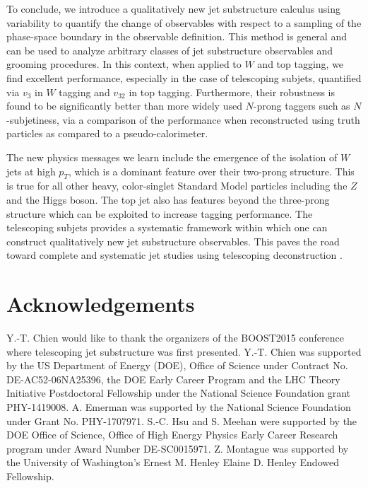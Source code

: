 \documentclass[aps,prl,floatfix,preprintnumbers,twocolumn,groupedaddress,nofootinbib]{revtex4-1}
\begin{document}
To conclude, we introduce a qualitatively new jet substructure calculus using variability to quantify the change of observables with respect to a sampling of the phase-space boundary in the observable definition. This method is general and can be used to analyze arbitrary classes of jet substructure observables and grooming procedures. In this context, when applied to $W$ and top tagging, we find excellent performance, especially in the case of telescoping subjets, quantified via $v_3$ in $W$ tagging and $v_{32}$ in top tagging. Furthermore, their robustness is found to be significantly better than more widely used $N$-prong taggers such as $N$-subjetiness, via a comparison of the performance when reconstructed using truth particles as compared to a pseudo-calorimeter.

The new physics messages we learn include the emergence of the isolation of $W$ jets at high $p_T$, which is a dominant feature over their two-prong structure. This is true for all other heavy, color-singlet Standard Model particles including the $Z$ and the Higgs boson. The top jet also has features beyond the three-prong structure which can be exploited to increase tagging performance. The telescoping subjets provides a systematic framework within which one can construct qualitatively new jet substructure observables. This paves the road toward complete and systematic jet studies using telescoping deconstruction \cite{Chien:2017decon}.




\section{Acknowledgements}
Y.-T. Chien would like to thank the organizers of the BOOST2015 conference where telescoping jet substructure was first presented. Y.-T. Chien was supported by the US Department of Energy (DOE), Office of Science under Contract No. DE-AC52-06NA25396, the DOE Early Career Program and the LHC Theory Initiative Postdoctoral Fellowship under the National Science Foundation grant PHY-1419008. A. Emerman was supported by the National Science Foundation under Grant No. PHY-1707971. S.-C. Hsu and S. Meehan were supported by the DOE Office of Science, Office of High Energy Physics Early Career Research program under Award Number DE-SC0015971. Z. Montague was supported by the University of Washington's Ernest M. Henley \text{\&} Elaine D. Henley Endowed Fellowship.



\end{document}
